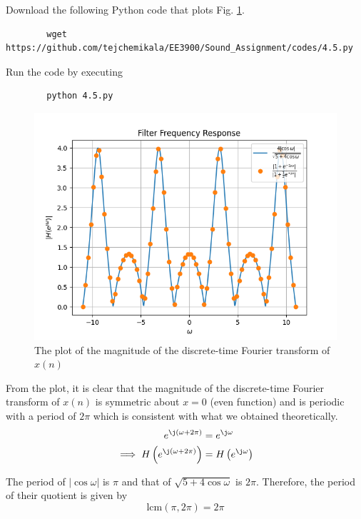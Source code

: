 \documentclass[journal,12pt,twocolumn]{IEEEtran}
\providecommand{\brak}[1]{\ensuremath{\left(#1\right)}}
\providecommand{\abs}[1]{\left\vert#1\right\vert}
\numberwithin{equation}{section}
\renewcommand\thesection{\arabic{section}}
\begin{document}
\begin{enumerate}[label=\thesection.\arabic*]
	Download the following Python code that plots Fig. \ref{fig-4.5}.
	\begin{lstlisting}
		wget https://github.com/tejchemikala/EE3900/Sound_Assignment/codes/4.5.py
	\end{lstlisting}
	
	Run the code by executing
	\begin{lstlisting}
		python 4.5.py
	\end{lstlisting}

	\begin{figure}[!ht]
		\centering
		\includegraphics[width=\columnwidth]{./figs/4.5.png}
		\caption{The plot of the magnitude of the discrete-time Fourier transform of $x(n)$}
		\label{fig-4.5}	
	\end{figure}

	From the plot, it is clear that the magnitude of the discrete-time Fourier transform of $x(n)$ is symmetric about $x = 0$ (even function) and is periodic with a period of $2\pi$ which is consistent with what we obtained theoretically.
	\begin{align}
		e^{\j \brak{\omega + 2\pi}} &= e^{\j \omega} \\
		\implies H\brak{e^{\j \brak{\omega + 2\pi}}} &= H\brak{e^{\j \omega}}
	\end{align}	 
	
	The period of $\abs{\cos\omega}$ is $\pi$ and that of $\sqrt{5 + 4\cos\omega}$ is $2\pi$. Therefore, the period of their quotient is given by
	\begin{equation}
		\textrm{lcm}(\pi, 2\pi) = 2\pi
	\end{equation}
	

\end{enumerate}
\end{document}

